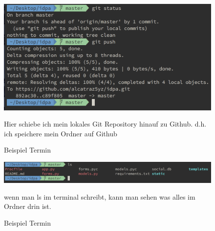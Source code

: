 \documentclass{article}
\begin{document}
        \begin{figure}[ht]
            \centering
            \includegraphics[width=.8\linewidth]{cli-git}
            \caption{Beispiel Termin}
            \label{fig:sub1}{Hier schiebe ich mein lokales Git Repository
            hinauf zu Github.
            d.h. ich speichere mein Ordner auf Github}
            \end{figure}

            \begin{figure}[ht]
                \centering
                \includegraphics[width=.9\linewidth]{cli-ls}
                \caption{Beispiel Termin}
                \label{fig:sub1}{wenn man ls im terminal schreibt, kann man sehen was alles im Ordner drin ist.}
                \end{figure}
\end{document}
